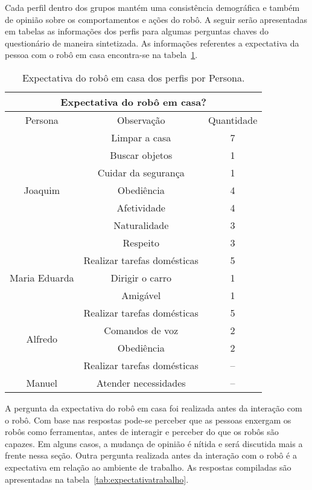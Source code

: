 Cada perfil dentro dos grupos mantém uma consistência demográfica e também de opinião sobre os comportamentos e ações do robô. A seguir serão apresentadas em tabelas as informações dos perfis para algumas perguntas chaves do questionário de maneira sintetizada. As informações referentes a expectativa da pessoa com o robô em casa encontra-se na tabela~\ref{tab:expectativacasa}.

\begin{table}[!ht]
	\caption{Expectativa do robô em casa dos perfis por Persona.}
	\label{tab:expectativacasa}
	\centering
	\begin{tabular}{c | c | c }
        \hline
        \multicolumn{3}{c}{Expectativa do robô em casa?} \\
        \hline
        Persona & Observação & Quantidade \\
        \hline
        \multirow{7}{*}{Joaquim} & Limpar a casa & 7 \\
        \hhline{~--}
        & Buscar objetos & 1 \\
        \hhline{~--}
        & Cuidar da segurança & 1 \\
        \hhline{~--}
        & Obediência & 4 \\
        \hhline{~--}
        & Afetividade & 4 \\
        \hhline{~--}
        & Naturalidade & 3 \\
        \hhline{~--}
        & Respeito & 3 \\
        \hline
        \multirow{3}{*}{Maria Eduarda} & Realizar tarefas domésticas & 5 \\
        \hhline{~--}
        & Dirigir o carro & 1 \\
        \hhline{~--}
        & Amigável & 1 \\
        \hline
        \multirow{4}{*}{Alfredo} & Realizar tarefas domésticas & 5 \\
        \hhline{~--}
        & Comandos de voz & 2 \\
        \hhline{~--}
        & Obediência & 2 \\
        \hline
        Danielo & Realizar tarefas domésticas & -- \\
        \hline
        Manuel & Atender necessidades & -- \\
        \hline
    \end{tabular}
\end{table}

A pergunta da expectativa do robô em casa foi realizada antes da interação com o robô. Com base nas respostas pode-se perceber que as pessoas enxergam os robôs como ferramentas, antes de interagir e perceber do que os robôs são capazes. Em alguns casos, a mudança de opinião é nítida e será discutida mais a frente nessa seção. Outra pergunta realizada antes da interação com o robô é a expectativa em relação ao ambiente de trabalho. As respostas compiladas são apresentadas na tabela~\ref{tab:expectativatrabalho}.

